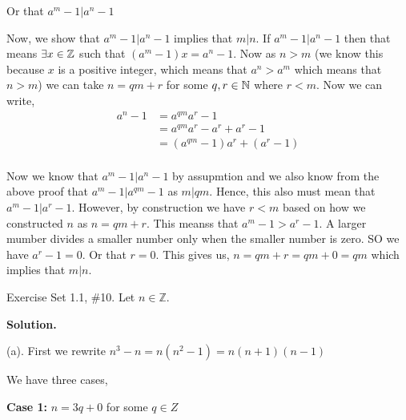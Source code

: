 \documentclass[12pt]{exam}
\begin{document}
\begin{questions}
Or that $a^{m} - 1 | a^{n} - 1$

Now, we show that  $a^{m} - 1 | a^{n} - 1 $ implies that $m | n$. If $a^{m} - 1 | a^{n} - 1$ then that means $\exists x\in \mathbb{Z}$ such that  $(a^{m} - 1)x = a^{n} - 1$. Now as $n > m$ (we know this because $x$ is a positive integer, which means that $a^{n} > a^{m}$ which means that $n > m$) we can take $n = qm + r$ for some  $q,r \in \mathbb{N}$ where $r < m$. Now we can write, 
\begin{align*}
    a^{n} - 1 &= a^{qm}a^{r}- 1\\
              &= a^{qm}a^{r} - a^{r} + a^{r} - 1\\
              &= (a^{qm} - 1)a^{r}+ (a^{r} - 1)\\
\end{align*}

Now we know that $a^{m} - 1 | a^{n} - 1$ by assupmtion and we also know from the above proof that $a^{m} - 1 | a^{qm} - 1$ as $m | qm$. Hence, this also must mean that  $a^{m} - 1  | a^{r} - 1$. However, by construction we have $r < m$ based on how we constructed  $n$ as $n = qm + r$. This meanss that $a^{m} - 1 > a^{r} - 1$. A larger mumber divides a smaller number only when the smaller number is zero. SO we have $a^{r} - 1 = 0$. Or that $r = 0$. This gives us,  $n = qm + r = qm + 0 = qm$ which implies that  $m | n$.
\



\newpage 
\question  Exercise Set 1.1, \#10. Let $n\in \mathbb{Z} 	$.

\textbf{Solution.} 

(a). First we rewrite $n^{3} - n = n(n^2 - 1) = n(n + 1)(n - 1)$

We have three cases, 

\textbf{Case 1:} $n = 3q + 0$ for some  $q \in Z$


\end{questions}
\end{document}
